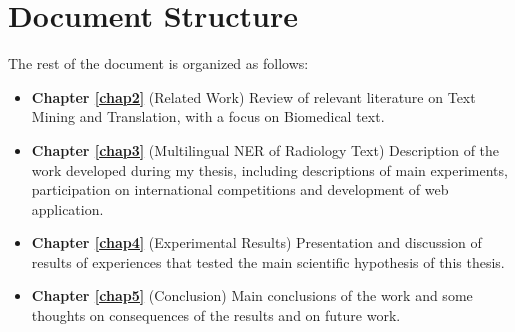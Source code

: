 \section{Document Structure}
The rest of the document is organized as follows:
\begin{itemize}
	\item \textbf{Chapter \ref{chap2}} (Related Work) Review of relevant literature on Text Mining and Translation, with a focus on Biomedical text.
	\item \textbf{Chapter \ref{chap3}} (Multilingual NER of Radiology Text) Description of the work developed during my thesis, including descriptions of main experiments, participation on international competitions and development of web application.
	\item \textbf{Chapter \ref{chap4}} (Experimental Results) Presentation and discussion of results of experiences that tested the main scientific hypothesis of this thesis.
	\item \textbf{Chapter \ref{chap5}} (Conclusion) Main conclusions of the work and some thoughts on consequences of the results and on future work.
\end{itemize}



